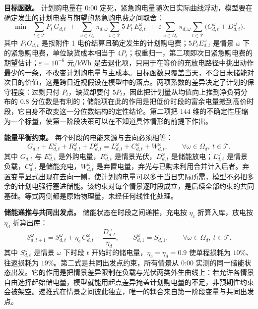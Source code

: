 \textbf{目标函数。} 计划购电量在 0:00 定死，紧急购电量随次日实际曲线浮动，模型要在确定发生的计划电费与期望的紧急购电费之间取舍：
\begin{equation}
\min \;\; \sum_{t \in \mathcal{T}} P_t\, G_{d,t} \;+\; \sum_{\omega \in \Omega_d} \pi_{d,\omega} \sum_{t \in \mathcal{T}} 5\, P_t\, E_{d,t}^{\omega}
\;+\;\varepsilon\sum_{\omega\in\Omega_d}\pi_{d,\omega}\sum_{t\in\mathcal{T}}\bigl(C_{d,t}^{\omega}+D_{d,t}^{\omega}\bigr).\label{eq:obj2}
\end{equation}
其中 $P_tG_{d,t}$ 是按附件 1 电价结算且确定发生的计划购电费；$5P_tE^{\omega}_{d,t}$ 是情景 $\omega$ 下的紧急购电费，单位缺货成本相当于 $4P_t$；权重归一，第二项即次日紧急购电费的期望估计；$\varepsilon=10^{-6}$ 元/kWh 是去退化项，只用于在等价的充放电路径中挑出动作最少的一条，不改变计划购电量与主成本。目标函数只覆盖当天，不含日末储能对次日的价值，这是跨日近视假设在模型中的落点。两项系数的差异决定了计划的保守程度：过剩只付 $P_t$，缺货却要付 $5P_t$，因此把计划量从均值向上推到净负荷分布的 $0.8$ 分位数是有利的\cite{khouja}；储能项在此的作用是把低价时段的富余电量搬到高价时段\cite{mao}，它自身不改变这一分位数结构的定性结论。第二项把 $144$ 维的不确定性压缩为一个标量，使第一阶段决策可以在不知道具体情形的前提下作出。

\textbf{能量平衡约束。} 每个时段的电能来源与去向必须相等：
\begin{equation}
G_{d,t} + E_{d,t}^{\omega} + R_{d,t}^{\omega} + D_{d,t}^{\omega} = L_{d,t}^{\omega} + C_{d,t}^{\omega} + W_{d,t}^{\omega}, \qquad \forall \omega \in \Omega_d,\ t \in \mathcal{T}.\label{eq:balance2}
\end{equation}
其中 $G_{d,t}$ 与 $E^{\omega}_{d,t}$ 是外购电量，$R^{\omega}_{d,t}$ 是情景光伏，$D^{\omega}_{d,t}$ 是储能放电；$L^{\omega}_{d,t}$ 是情景负载，$C^{\omega}_{d,t}$ 是储能充电，$W^{\omega}_{d,t}$ 是弃置电量，弃光与已购未利用合并计入后者。弃置变量显式出现在去向一侧，使计划购电量可以多于当日实际所需，模型不必把多余的计划电强行塞进储能。该约束对每个情景逐时段成立，是后续全部约束的共同基础。等式两侧都是原始物理量，未经任何线性化处理。

\textbf{储能递推与共同出发点。} 储能状态在时段之间递推，充电按 $\eta_c$ 折算入库，放电按 $\eta_d$ 折算出库：
\begin{equation}
S_{d,t+1}^{\omega} = S_{d,t}^{\omega} + \eta_c\, C_{d,t}^{\omega} - \frac{D_{d,t}^{\omega}}{\eta_d}, \qquad
S_{d,1}^{\omega} = S_{d,1}, \qquad \forall \omega \in \Omega_d,\ t \in \mathcal{T}.\label{eq:soc2}
\end{equation}
其中 $S^{\omega}_{d,t}$ 是情景 $\omega$ 下时段 $t$ 开始时的储电量，$\eta_c=\eta_d=0.9$ 使单程损耗为 $10\%$、往返损耗为 $19\%$。第二式是共同出发点约束，所有情景从 0:00 实测的同一储能状态出发。它的作用是把情景差异限制在负载与光伏两类外生曲线上：若允许各情景自由选择起始储电量，模型就能用起点差异掩盖计划购电量的不足，非预期性约束会被架空。递推式在情景之间彼此独立，唯一的耦合来自第一阶段变量与共同出发点。

